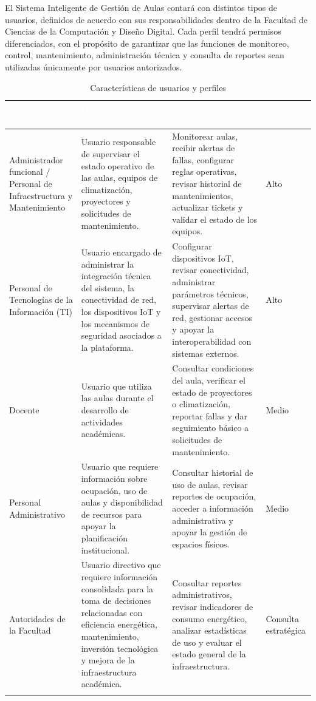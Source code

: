 
El Sistema Inteligente de Gestión de Aulas contará con distintos tipos de usuarios, definidos de acuerdo con sus responsabilidades dentro de la Facultad de Ciencias de la Computación y Diseño Digital. Cada perfil tendrá permisos diferenciados, con el propósito de garantizar que las funciones de monitoreo, control, mantenimiento, administración técnica y consulta de reportes sean utilizadas únicamente por usuarios autorizados.


\begingroup
\small
\begin{longtable}{|p{3.9cm}|p{3.9cm}|p{3.9cm}|p{3.9cm}|}
\hline
\cellcolor{sigagreen}\textcolor{white}{\textbf{Tipo de usuario}} & \cellcolor{sigagreen}\textcolor{white}{\textbf{Descripción del perfil}} & \cellcolor{sigagreen}\textcolor{white}{\textbf{Funciones principales}} & \cellcolor{sigagreen}\textcolor{white}{\textbf{Nivel de acceso}} \\ \hline
Administrador funcional / Personal de Infraestructura y Mantenimiento & Usuario responsable de supervisar el estado operativo de las aulas, equipos de climatización, proyectores y solicitudes de mantenimiento. & Monitorear aulas, recibir alertas de fallas, configurar reglas operativas, revisar historial de mantenimientos, actualizar tickets y validar el estado de los equipos. & Alto \\ \hline
Personal de Tecnologías de la Información (TI) & Usuario encargado de administrar la integración técnica del sistema, la conectividad de red, los dispositivos IoT y los mecanismos de seguridad asociados a la plataforma. & Configurar dispositivos IoT, revisar conectividad, administrar parámetros técnicos, supervisar alertas de red, gestionar accesos y apoyar la interoperabilidad con sistemas externos. & Alto \\ \hline
Docente & Usuario que utiliza las aulas durante el desarrollo de actividades académicas. & Consultar condiciones del aula, verificar el estado de proyectores o climatización, reportar fallas y dar seguimiento básico a solicitudes de mantenimiento. & Medio \\ \hline
Personal Administrativo & Usuario que requiere información sobre ocupación, uso de aulas y disponibilidad de recursos para apoyar la planificación institucional. & Consultar historial de uso de aulas, revisar reportes de ocupación, acceder a información administrativa y apoyar la gestión de espacios físicos. & Medio \\ \hline
Autoridades de la Facultad & Usuario directivo que requiere información consolidada para la toma de decisiones relacionadas con eficiencia energética, mantenimiento, inversión tecnológica y mejora de la infraestructura académica. & Consultar reportes administrativos, revisar indicadores de consumo energético, analizar estadísticas de uso y evaluar el estado general de la infraestructura. & Consulta estratégica \\ \hline
\caption{Características de usuarios y perfiles}
\end{longtable}
\endgroup

